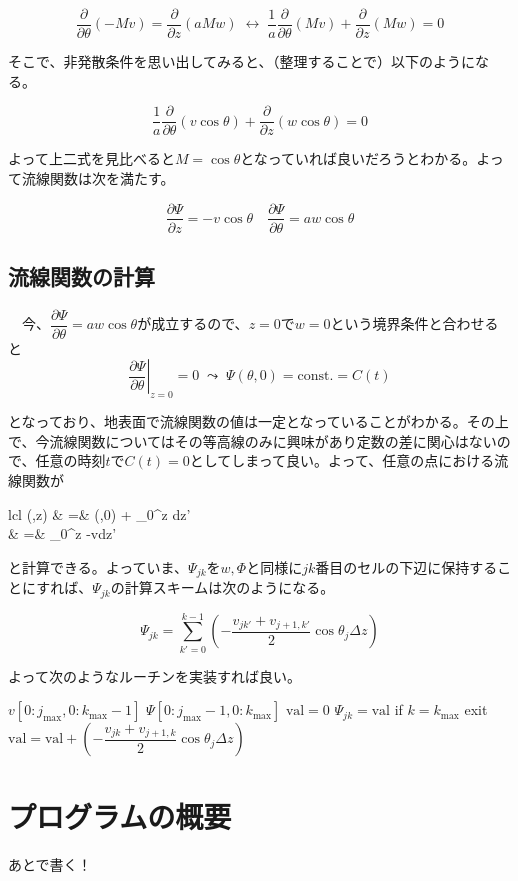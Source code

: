 \documentclass[ja=standard,xelatex]{bxjsarticle}
\newcommand{\vs}[1]{\vskip#1\baselineskip}
\newcommand{\neqn}[1]{\begin{equation}{#1}\end{equation}}
\newcommand{\neqns}[2]{\begin{IEEEeqnarray}{#1}#2\end{IEEEeqnarray}}
\newcommand{\neqnsequal}{\; =\;}
\newcommand{\pdif}[2]{\dfrac{\partial{#1}}{\partial#2}}
\newcommand{\pdifop}[1]{\dfrac{\partial}{\partial#1}}
\newcommand{\dint}{\displaystyle\int}
\newcommand{\dsum}{\displaystyle\sum}
\newcommand{\bracketnormal}[1]{\left(#1\right)}
\begin{document}
\neqn{
  \pdifop{\theta}\bracketnormal{-Mv} = \pdifop{z}\bracketnormal{aMw}\;\leftrightarrow \; \dfrac{1}{a}\pdifop{\theta}\bracketnormal{Mv} + \pdifop{z}\bracketnormal{Mw} = 0
}

そこで、非発散条件を思い出してみると、（整理することで）以下のようになる。

\neqn{
  \dfrac{1}{a}\pdifop{\theta}\bracketnormal{v\cos\theta} + \pdifop{z}\bracketnormal{w\cos\theta}=0
}

よって上二式を見比べると$M=\cos\theta$となっていれば良いだろうとわかる。よって流線関数は次を満たす。

\neqn{
  \pdif{\Psi}{z} = -v\cos\theta\quad \pdif{\Psi}{\theta} = aw\cos\theta
}

\subsection{流線関数の計算}
　今、$\pdif{\Psi}{\theta} = aw\cos\theta$が成立するので、$z=0$で$w=0$という境界条件と合わせると
\neqn{
  \left.\pdif{\Psi}{\theta}\right|_{z=0} = 0 \;\leadsto \; \Psi\bracketnormal{\theta,0} = \text{const.} = C(t)
}

となっており、地表面で流線関数の値は一定となっていることがわかる。その上で、今流線関数についてはその等高線のみに興味があり定数の差に関心はないので、任意の時刻$t$で$C(t)=0$としてしまって良い。よって、任意の点における流線関数が

\neqns{lcl}{
  \Psi\bracketnormal{\theta,z} &\neqnsequal& \Psi\bracketnormal{\theta,0} + \dint_0^z \pdif{\Psi}{z}dz'\\
  &\neqnsequal & \dint_0^z -v\cos\theta dz'
}

と計算できる。よっていま、$\Psi_{jk}$を$w,\Phi$と同様に$jk$番目のセルの下辺に保持することにすれば、$\Psi_{jk}$の計算スキームは次のようになる。

\neqn{
  \Psi_{jk} = \dsum_{k'=0}^{k-1} \bracketnormal{-\dfrac{v_{jk'}+v_{j+1,k'}}{2}\cos\theta_j\Delta z}
}

よって次のようなルーチンを実装すれば良い。
\vs{0.5}

\begin{algorithm}[H]
  \caption*{\textbf{subroutine:} calculate\_stream\_function}
  \begin{algorithmic}[1]
    \Require $v[0:j_\text{max},0:k_\text{max}-1]$
    \Ensure $\Psi[0:j_\text{max}-1,0:k_\text{max}]$
    \Statex
    \State $\text{val}=0$
    \State $\Psi_{jk}=\text{val}$
    \State if $k=k_\text{max}$ exit
    \State $\text{val}=\text{val}+\bracketnormal{-\dfrac{v_{jk}+v_{j+1,k}}{2}\cos\theta_j\Delta z}$
    \EndDo
    \EndDo
    
  \end{algorithmic}
\end{algorithm}



\section{プログラムの概要}
{\color{red}あとで書く！}
\end{document}
